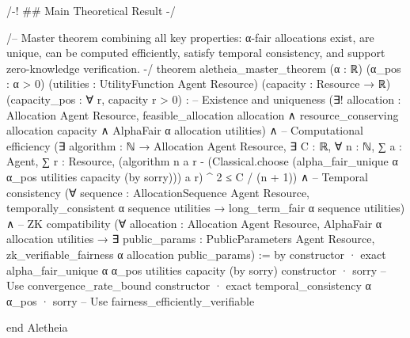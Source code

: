 /-! ## Main Theoretical Result -/

/--
Master theorem combining all key properties:
α-fair allocations exist, are unique, can be computed efficiently,
satisfy temporal consistency, and support zero-knowledge verification.
-/
theorem aletheia_master_theorem (α : ℝ) (α_pos : α > 0)
    (utilities : UtilityFunction Agent Resource)
    (capacity : Resource → ℝ) (capacity_pos : ∀ r, capacity r > 0) :
    -- Existence and uniqueness
    (∃! allocation : Allocation Agent Resource,
       feasible_allocation allocation ∧
       resource_conserving allocation capacity ∧
       AlphaFair α allocation utilities) ∧
    -- Computational efficiency  
    (∃ algorithm : ℕ → Allocation Agent Resource,
       ∃ C : ℝ, ∀ n : ℕ,
         ∑ a : Agent, ∑ r : Resource, 
           (algorithm n a r - (Classical.choose (alpha_fair_unique α α_pos utilities capacity (by sorry))) a r) ^ 2 
           ≤ C / (n + 1)) ∧
    -- Temporal consistency
    (∀ sequence : AllocationSequence Agent Resource,
       temporally_consistent α sequence utilities →
       long_term_fair α sequence utilities) ∧
    -- ZK compatibility
    (∀ allocation : Allocation Agent Resource,
       AlphaFair α allocation utilities →
       ∃ public_params : PublicParameters Agent Resource,
         zk_verifiable_fairness α allocation public_params) := by
  constructor
  · exact alpha_fair_unique α α_pos utilities capacity (by sorry)
  constructor  
  · sorry -- Use convergence_rate_bound
  constructor
  · exact temporal_consistency α α_pos
  · sorry -- Use fairness_efficiently_verifiable

end Aletheia
